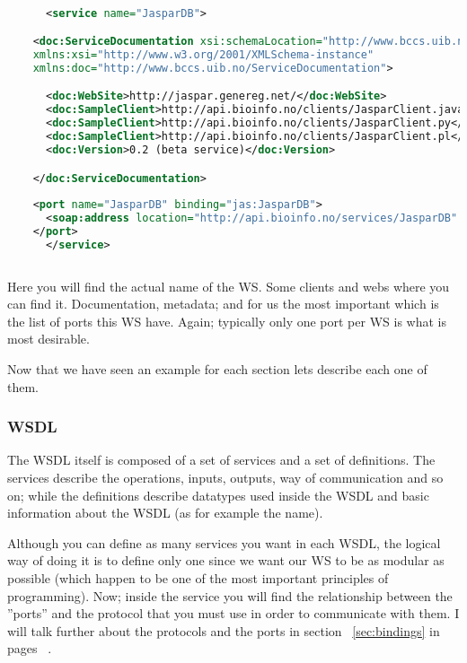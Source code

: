 \documentclass[a4paper,10pt]{article}
\begin{document}
\begin{description}
      \begin{lstlisting}[language=XML]  

      <service name="JasparDB">

	<doc:ServiceDocumentation xsi:schemaLocation="http://www.bccs.uib.no/ServiceDocumentation http://api.bioinfo.no/schema/ServiceDocumentation.xsd"
	xmlns:xsi="http://www.w3.org/2001/XMLSchema-instance"
	xmlns:doc="http://www.bccs.uib.no/ServiceDocumentation">

	  <doc:WebSite>http://jaspar.genereg.net/</doc:WebSite>
	  <doc:SampleClient>http://api.bioinfo.no/clients/JasparClient.java</doc:SampleClient>
	  <doc:SampleClient>http://api.bioinfo.no/clients/JasparClient.py</doc:SampleClient>
	  <doc:SampleClient>http://api.bioinfo.no/clients/JasparClient.pl</doc:SampleClient>
	  <doc:Version>0.2 (beta service)</doc:Version>

	</doc:ServiceDocumentation>
	
	<port name="JasparDB" binding="jas:JasparDB">
	  <soap:address location="http://api.bioinfo.no/services/JasparDB" />
	</port>
      </service>
  
      \end{lstlisting}

      Here you will find the actual name of the WS. Some clients and webs where you can find it. Documentation, metadata; and for us the most important which is the list of ports this WS have. Again; typically only one port per WS is what is most desirable.\vspace{3 mm}

    \end{description}

    Now that we have seen an example for each section lets describe each one of them.\vspace{3 mm}

    \subsubsection{WSDL}

    The WSDL itself is composed of a set of services and a set of definitions. The services describe the operations, inputs, outputs, way of communication and so on; while the definitions describe datatypes used inside the WSDL and basic information about the WSDL (as for example the name).\vspace{3 mm}

    Although you can define as many services you want in each WSDL, the logical way of doing it is to define only one since we want our WS to be as modular as possible (which happen to be one of the most important principles of programming). Now;  inside the service you will find the relationship between the ''ports'' and the protocol that you must use in order to communicate with them. I will talk further about the protocols and the ports in section ~\ref{sec:bindings} in pages ~\pageref{sec:bindings}.\vspace{3 mm}
\end{document}
